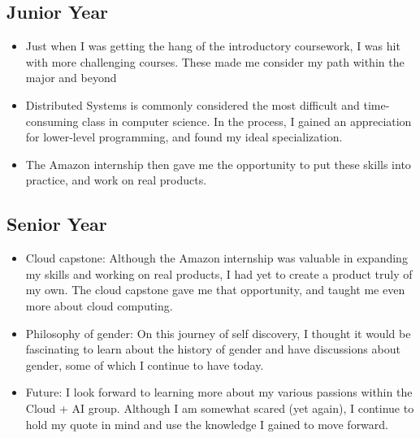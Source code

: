 \documentclass{article}
\begin{document}
\subsection{Junior Year}
\begin{itemize}
    \item Just when I was getting the hang of the introductory coursework, I was hit with more challenging courses. These made me consider my path within the major and beyond
    \item Distributed Systems is commonly considered the most difficult and time-consuming class in computer science. In the process, I gained an appreciation for lower-level programming, and found my ideal specialization.
    \item The Amazon internship then gave me the opportunity to put these skills into practice, and work on real products.
\end{itemize}
\subsection{Senior Year}
\begin{itemize}
    \item Cloud capstone: Although the Amazon internship was valuable in expanding my skills and working on real products, I had yet to create a product truly of my own. The cloud capstone gave me that opportunity, and taught me even more about cloud computing.
    \item Philosophy of gender: On this journey of self discovery, I thought it would be fascinating to learn about the history of gender and have discussions about gender, some of which I continue to have today.
    \item Future: I look forward to learning more about my various passions within the Cloud + AI group. Although I am somewhat scared (yet again), I continue to hold my quote in mind and use the knowledge I gained to move forward.
\end{itemize}
\end{document}
